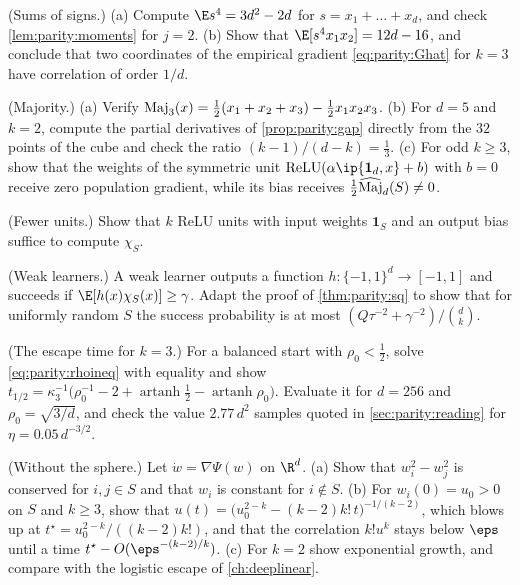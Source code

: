 \begin{refsection}
\begin{exercises}
\item \consolidation (Sums of signs.) (a) Compute $\E s^4=3d^2-2d$ for $s=x_1+\dots+x_d$, and check \cref{lem:parity:moments} for $j=2$. (b) Show that $\E[s^4x_1x_2]=12d-16$, and conclude that two coordinates of the empirical gradient \eqref{eq:parity:Ghat} for $k=3$ have correlation of order $1/d$.\label{ex:parity:moments}

\item \consolidation (Majority.) (a) Verify $\operatorname{Maj}_3(x)=\frac12(x_1+x_2+x_3)-\frac12x_1x_2x_3$. (b) For $d=5$ and $k=2$, compute the partial derivatives of \cref{prop:parity:gap} directly from the $32$ points of the cube and check the ratio $(k-1)/(d-k)=\frac13$. (c) For odd $k\ge3$, show that the weights of the symmetric unit $\relu(\alpha\ip{\mathbf 1_d,x}+b)$ with $b=0$ receive zero population gradient, while its bias receives $\frac12\widehat{\operatorname{Maj}}_d(S)\ne0$.\label{ex:parity:majority}

\item \consolidation (Fewer units.) Show that $k$ ReLU units with input weights $\mathbf 1_S$ and an output bias suffice to compute $\chi_S$. \label{ex:parity:fewer}

\item \consolidation (Weak learners.) A weak learner outputs a function $h\colon\{-1,1\}^d\to[-1,1]$ and succeeds if $\E[h(x)\chi_S(x)]\ge\gamma$. Adapt the proof of \cref{thm:parity:sq} to show that for uniformly random $S$ the success probability is at most $(Q\tau^{-2}+\gamma^{-2})/\binom dk$.\label{ex:parity:weak}

\item \consolidation (The escape time for $k=3$.) For a balanced start with $\rho_0<\frac12$, solve \eqref{eq:parity:rhoineq} with equality and show $t_{1/2}=\kappa_3^{-1}\bigl(\rho_0^{-1}-2+\operatorname{artanh}\frac12-\operatorname{artanh}\rho_0\bigr)$. Evaluate it for $d=256$ and $\rho_0=\sqrt{3/d}$, and check the value $2.77\,d^2$ samples quoted in \cref{sec:parity:reading} for $\eta=0.05\,d^{-3/2}$.\label{ex:parity:escape}

\item \variation (Without the sphere.) Let $\dot w=\nabla\Psi(w)$ on $\R^d$. (a) Show that $w_i^2-w_j^2$ is conserved for $i,j\in S$ and that $w_i$ is constant for $i\notin S$. (b) For $w_i(0)=u_0>0$ on $S$ and $k\ge3$, show that $u(t)=\bigl(u_0^{2-k}-(k-2)k!\,t\bigr)^{-1/(k-2)}$, which blows up at $t^\star=u_0^{2-k}/((k-2)k!)$, and that the correlation $k!u^k$ stays below $\eps$ until a time $t^\star-O(\eps^{-(k-2)/k})$. (c) For $k=2$ show exponential growth, and compare with the logistic escape of \cref{ch:deeplinear}.\label{ex:parity:unconstrained}


\end{exercises}
\end{refsection}
